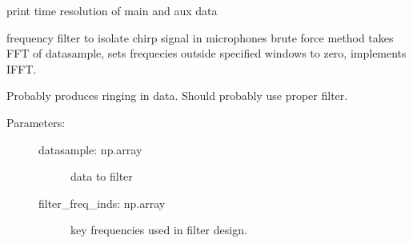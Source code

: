 \documentclass[letterpaper,10pt,english]{sphinxmanual}
\begin{document}
\begin{fulllineitems}
\begin{fulllineitems}
\end{fulllineitems}


\begin{fulllineitems}
\label{\detokenize{code:ATom.atom_functions.dataset.time_info}}
print time resolution of main and aux data

\end{fulllineitems}


\end{fulllineitems}


\begin{fulllineitems}
\label{\detokenize{code:ATom.atom_functions.freq_filter}}
frequency filter to isolate chirp signal in microphones
brute force method takes FFT of datasample, sets frequecies
outside specified windows to zero, implements IFFT.

Probably produces ringing in data. Should probably use proper filter.
\begin{description}
\item[{Parameters:}] \leavevmode\begin{description}
\item[{datasample: np.array}] \leavevmode
data to filter

\item[{filter\_freq\_inds: np.array}] \leavevmode
key frequencies used in filter design.

\end{description}

\end{description}

\end{fulllineitems}

\end{document}
